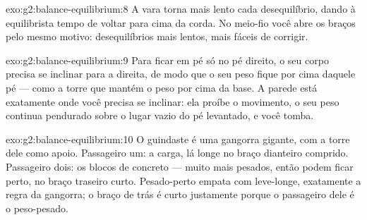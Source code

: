 \begin{solution}{exo:g2:balance-equilibrium:8}
A vara torna mais lento cada desequilíbrio, dando à equilibrista
tempo de voltar para cima da corda. No meio-fio você abre os braços
pelo mesmo motivo: desequilíbrios mais lentos, mais fáceis de
corrigir.
\end{solution}

\begin{solution}{exo:g2:balance-equilibrium:9}
Para ficar em pé só no pé direito, o seu corpo precisa se inclinar
para a direita, de modo que o seu peso fique por cima daquele pé ---
como a torre que mantém o peso por cima da base. A parede está
exatamente onde você precisa se inclinar: ela proíbe o movimento, o
seu peso continua pendurado sobre o lugar vazio do pé levantado, e
você tomba.
\end{solution}

\begin{solution}{exo:g2:balance-equilibrium:10}
O guindaste é uma gangorra gigante, com a torre dele como apoio.
Passageiro um: a carga, lá longe no braço dianteiro comprido.
Passageiro dois: os blocos de concreto --- muito mais pesados, então
podem ficar perto, no braço traseiro curto. Pesado-perto empata com
leve-longe, exatamente a regra da gangorra; o braço de trás é curto
justamente porque o passageiro dele é o peso-pesado.
\end{solution}
